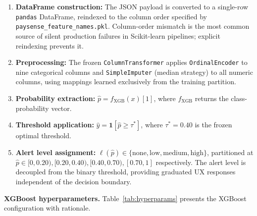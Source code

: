 \documentclass[conference]{IEEEtran}
\begin{document}
\begin{enumerate}
    \item \textbf{DataFrame construction:} The JSON payload is converted to a
    single-row \texttt{pandas} DataFrame, reindexed to the column order
    specified by \texttt{paysense\_feature\_names.pkl}. Column-order mismatch
    is the most common source of silent production failures in Scikit-learn
    pipelines; explicit reindexing prevents it.

    \item \textbf{Preprocessing:} The frozen \texttt{ColumnTransformer} applies
    \texttt{OrdinalEncoder} to nine categorical columns and
    \texttt{SimpleImputer} (median strategy) to all numeric columns, using
    mappings learned exclusively from the training partition.

    \item \textbf{Probability extraction:}
    $\hat{p} = f_{\text{XGB}}(x)[1]$, where $f_{\text{XGB}}$ returns the
    class-probability vector.

    \item \textbf{Threshold application:}
    $\hat{y} = \mathbf{1}[\hat{p} \geq \tau^*]$, where $\tau^* = 0.40$
    is the frozen optimal threshold.

    \item \textbf{Alert level assignment:}
    $\ell(\hat{p}) \in \{\text{none}, \text{low}, \text{medium}, \text{high}\}$,
    partitioned at $\hat{p} \in [0, 0.20), [0.20, 0.40), [0.40, 0.70),
    [0.70, 1]$ respectively. The alert level is decoupled from the binary
    threshold, providing graduated UX responses independent of the
    decision boundary.
\end{enumerate}

\textbf{XGBoost hyperparameters.}
Table~\ref{tab:hyperparams} presents the XGBoost configuration with
rationale.
\end{document}
